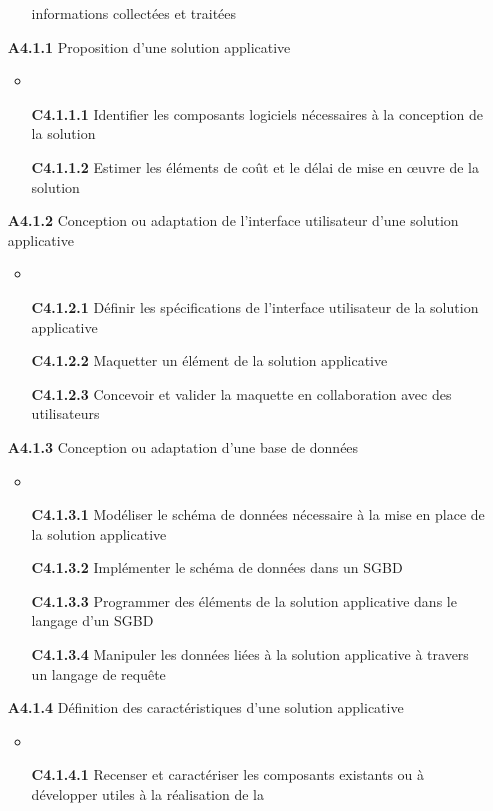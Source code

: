 \documentclass[12pt,a4paper,oneside,titlepage,final]{article}
\begin{document}
\begin{enumerate}
\begin{itemize}
    informations collectées et traitées
  \end{itemize}
  \item [\textbf{A4.1.1}] Proposition d'une solution applicative
  \begin{itemize}
    \item \item [\textbf{C4.1.1.1}] Identifier les composants
    logiciels nécessaires à la conception de la solution
    \item [\textbf{C4.1.1.2}] Estimer les éléments de coût et le délai
    de mise en œuvre de la solution
  \end{itemize}
  \item [\textbf{A4.1.2}] Conception ou adaptation de l'interface
  utilisateur d'une solution applicative
  \begin{itemize}
    \item \item [\textbf{C4.1.2.1}] Définir les spécifications de
    l'interface utilisateur de la solution applicative
    \item [\textbf{C4.1.2.2}] Maquetter un élément de la solution
    applicative
    \item [\textbf{C4.1.2.3}] Concevoir et valider la maquette en
    collaboration avec des utilisateurs
  \end{itemize}
  \item [\textbf{A4.1.3}] Conception ou adaptation d'une base de
  données
  \begin{itemize}
    \item \item [\textbf{C4.1.3.1}] Modéliser le schéma de données
    nécessaire à la mise en place de la solution applicative
    \item [\textbf{C4.1.3.2}] Implémenter le schéma de données dans un
    SGBD
    \item [\textbf{C4.1.3.3}] Programmer des éléments de la solution
    applicative dans le langage d'un SGBD
    \item [\textbf{C4.1.3.4}] Manipuler les données liées à la
    solution applicative à travers un langage de requête
  \end{itemize}
  \item [\textbf{A4.1.4}] Définition des caractéristiques d'une
  solution applicative
  \begin{itemize}
    \item \item [\textbf{C4.1.4.1}] Recenser et caractériser les
    composants existants ou à développer utiles à la réalisation de la

\end{itemize}
\end{enumerate}
\end{document}
